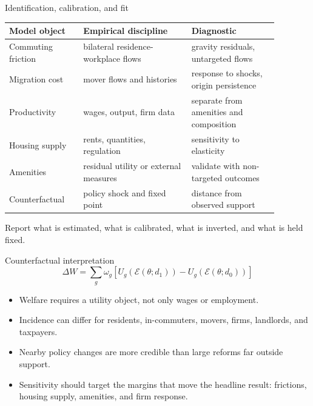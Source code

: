 \documentclass[aspectratio=169,11pt]{beamer}
\newcommand{\1}{\mathbf{1}}
\begin{document}
\begin{frame}{Identification, calibration, and fit}
\small
\begin{tabular}{p{0.24\linewidth} p{0.35\linewidth} p{0.29\linewidth}}
\toprule
Model object & Empirical discipline & Diagnostic \\
\midrule
Commuting friction & bilateral residence-workplace flows & gravity residuals, untargeted flows \\
Migration cost & mover flows and histories & response to shocks, origin persistence \\
Productivity & wages, output, firm data & separate from amenities and composition \\
Housing supply & rents, quantities, regulation & sensitivity to elasticity \\
Amenities & residual utility or external measures & validate with non-targeted outcomes \\
Counterfactual & policy shock and fixed point & distance from observed support \\
\bottomrule
\end{tabular}

\medskip
Report what is estimated, what is calibrated, what is inverted, and what is held fixed.
\end{frame}

\begin{frame}{Counterfactual interpretation}
\small
\[
\Delta W
=
\sum_g \omega_g
\left[
U_g(\mathcal{E}(\theta;d_1))
-
U_g(\mathcal{E}(\theta;d_0))
\right]
\]

\begin{itemize}
    \item Welfare requires a utility object, not only wages or employment.
    \item Incidence can differ for residents, in-commuters, movers, firms, landlords, and taxpayers.
    \item Nearby policy changes are more credible than large reforms far outside support.
    \item Sensitivity should target the margins that move the headline result: frictions, housing supply, amenities, and firm response.
\end{itemize}
\end{frame}
\end{document}
